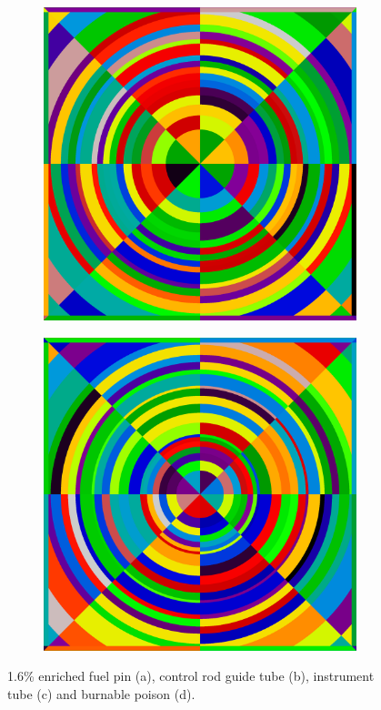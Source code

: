 \begin{figure}[h!]
\begin{subfigure}{.5\textwidth}
  \caption{}
  \label{fig:chap8-pin-crgt}
\end{subfigure}
\begin{subfigure}{.5\textwidth}
  \centering
  \includegraphics[width=0.9\linewidth]{figures/quantification/fsrs/fsrs-instr-tube}
  \caption{}
  \label{fig:chap8-instr-tube}
\end{subfigure}%
\begin{subfigure}{.5\textwidth}
  \centering
  \includegraphics[width=0.9\linewidth]{figures/quantification/fsrs/fsrs-bp}
  \caption{}
  \label{fig:chap8-bp}
\end{subfigure}%
\caption[BEAVRS pin cell FSR discretization]{1.6\% enriched fuel pin (a), control rod guide tube (b), instrument tube (c) and burnable poison (d).}
\label{fig:chap8-pin-cell-fsrs}
\end{figure}

